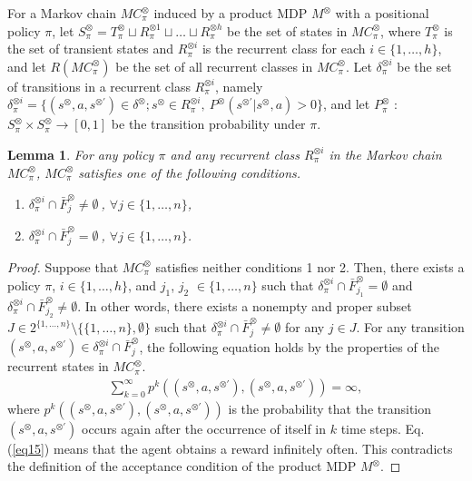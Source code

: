 \documentclass[letterpaper, 10 pt, conference]{ieeeconf}  %
\newtheorem{lemma}{Lemma}
\begin{document}
For a Markov chain $MC^{\otimes}_{\pi}$ induced by a product MDP $M^{\otimes}$ with a positional policy $\pi$, let $S^{\otimes}_{\pi}= T^{\otimes}_{\pi} \sqcup R^{\otimes 1}_{\pi} \sqcup \ldots \sqcup R^{\otimes h}_{\pi}$ be the set of states in $MC^{\otimes}_{\pi}$, where $T^{\otimes}_{\pi}$ is the set of transient states and $R^{\otimes i}_{\pi}$ is the recurrent class for each $i \in \{ 1, \ldots ,h \}$, and let $R(MC^{\otimes}_{\pi})$ be the set of all recurrent classes in $MC^{\otimes}_{\pi}$. Let $\delta^{\otimes i}_{\pi}$ be the set of transitions in a recurrent class $R^{\otimes i}_{\pi}$, namely $\delta^{\otimes i}_{\pi} = \{ (s^{\otimes},a,s^{\otimes \prime}) \in \delta^{\otimes} ; s^{\otimes} \in R^{\otimes i}_{\pi},\ P^{\otimes}(s^{\otimes \prime}|s^{\otimes},a) > 0 \}$, and let $P^{\otimes}_{\pi}$ : $S^{\otimes}_{\pi} \times S^{\otimes}_{\pi} \rightarrow [0,1]$ be the transition probability under $\pi$.

\begin{lemma}
  For any policy $\pi$ and any recurrent class $R^{\otimes i}_{\pi}$ in the Markov chain $MC^{\otimes}_{\pi}$,
  $MC^{\otimes}_{\pi}$ satisfies one of the following conditions.
  \vspace{2mm}
  \begin{enumerate}
    \item $\delta^{\otimes i}_{\pi} \cap \bar{F}^{\otimes}_j \neq \emptyset\ $, $ \forall j \in \{ 1, \ldots ,n \}$,
    \item $\delta^{\otimes i}_{\pi} \cap \bar{F}^{\otimes}_j = \emptyset\ $, $ \forall j \in \{ 1, \ldots ,n \}$.
  \end{enumerate}
  \label{lemma1}
\end{lemma}

\begin{proof}
  Suppose that $MC^{\otimes}_{\pi}$ satisfies neither conditions 1 nor 2. Then, there exists a policy $\pi$, $i \in \{ 1, \ldots ,h \}$, and $j_1$, $j_2$ $\in \{ 1, \ldots ,n \}$ such that $\delta^{\otimes i}_{\pi} \cap \bar{F}^{\otimes}_{j_1} = \emptyset$ and $\delta^{\otimes i}_{\pi} \cap \bar{F}^{\otimes}_{j_2} \neq \emptyset$. In other words, there exists a nonempty and proper subset $J \in 2^{\{ 1, \ldots ,n \}} \setminus \{ \{ 1, \ldots ,n \}, \emptyset \}$ such that $ \delta^{\otimes i}_{\pi} \cap \bar{F}^{\otimes}_j \neq \emptyset $ for any $j \in J$.
   For any transition $ (s^{\otimes},a,s^{\otimes \prime}) \in \delta^{\otimes i}_{\pi} \cap \bar{F}^{\otimes}_j$, the following equation holds by the properties of the recurrent states in $MC^{\otimes}_{\pi}$\cite{ESS}.
  \begin{align}
    \sum_{k=0}^{\infty} p^k((s^{\otimes},a,s^{\otimes \prime}),(s^{\otimes},a,s^{\otimes \prime})) = \infty,
    \label{eq15}
  \end{align}
  where $p^k((s^{\otimes},a,s^{\otimes \prime}),(s^{\otimes},a,s^{\otimes \prime}))$ is the probability that the transition $(s^{\otimes},a,s^{\otimes \prime})$ occurs again after the occurrence of itself in $k$ time steps. Eq. (\ref{eq15}) means that the agent obtains a reward infinitely often. This contradicts the definition of the acceptance condition of the product MDP $M^{\otimes}$.
\end{proof}
\end{document}
